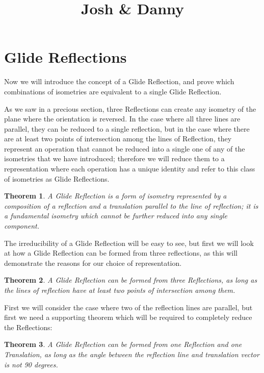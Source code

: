 \documentclass[11pt]{article}
\newtheorem{theorem}{Theorem}[section]
\theoremstyle{definition}
\begin{document}


\title{Josh \& Danny}

\maketitle

\section{Glide Reflections}
Now we will introduce the concept of a Glide Reflection, and prove which
combinations of isometries are equivalent to a single Glide Reflection.

As we saw in a precious section, three Reflections can create any isometry of
the plane where the orientation is reversed. In the case where all three lines
are parallel, they can be reduced to a single reflection, but in the case where
there are at least two points of intersection among the lines of Reflection,
they represent an operation that cannot be reduced into a single one of any of
the isometries that we have introduced; therefore we will reduce them to a
representation where each operation has a unique identity and refer to this
class of isometries as Glide Reflections.

\begin{theorem}\label{Glide Reflection}
  A Glide Reflection is a form of isometry represented by a composition of a
reflection and a translation parallel to the line of reflection; it is a
fundamental isometry which cannot be further reduced into any single component.
\end{theorem}

The irreducibility of a Glide Reflection will be easy to see, but first we will
look at how a Glide Reflection can be formed from three reflections, as this
will demonstrate the reasons for our choice of representation.

\begin{theorem}\label{3 Reflections form a Glide Reflection}
  A Glide Reflection can be formed from three Reflections, as long as the
  lines of reflection have at least two points of intersection among them.
\end{theorem}

First we will consider the case where two of the reflection lines are parallel,
but first we need a supporting theorem which will be required to completely
reduce the Reflections:

\begin{theorem}\label{Glide Reflection from a Reflection and a Translation}
  A Glide Reflection can be formed from one Reflection and one Translation,
  as long as the angle between the reflection line and translation vector is
  not 90 degrees.
\end{theorem}
\end{document}
